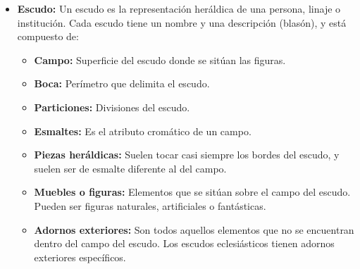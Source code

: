 \begin{itemize}
    \item \textbf{Escudo: } Un escudo es la representación heráldica de una persona, linaje o institución.
    Cada escudo tiene un nombre y una descripción (blasón), y está compuesto de:
    \begin{itemize}
        \item \textbf{Campo: } Superficie del escudo donde se sitúan las figuras.
        \item \textbf{Boca: } Perímetro que delimita el escudo.
        \item \textbf{Particiones: } Divisiones del escudo.
        \item \textbf{Esmaltes: } Es el atributo cromático de un campo.
        \item \textbf{Piezas heráldicas: } Suelen tocar casi siempre los bordes del escudo, y suelen ser de
        esmalte diferente al del campo.
        \item \textbf{Muebles o figuras: } Elementos que se sitúan sobre el campo del escudo. Pueden ser
        figuras naturales, artificiales o fantásticas.
        \item \textbf{Adornos exteriores: } Son todos aquellos elementos que no se encuentran dentro del 
        campo del escudo. Los escudos eclesiásticos tienen adornos exteriores específicos.
    \end{itemize}

\end{itemize}
